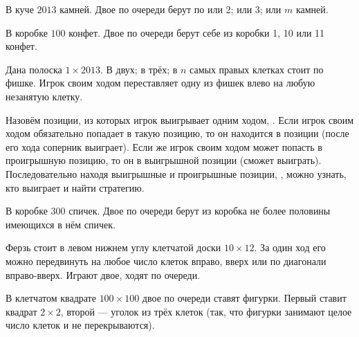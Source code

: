 \documentclass[a4paper,11pt]{article}
\begin{document}
В куче $2013$ камней. Двое по очереди берут по
 или 2;
 или 3;
 или $m$ камней. %

В коробке $100$ конфет. Двое по очереди берут себе из коробки
1, 10 или 11 конфет. %


Дана полоска $1\times2013$.
 В двух;
 в трёх;
 в $n$ самых правых клетках стоит по фишке.
Игрок своим ходом переставляет одну из фишек влево
на любую незанятую клетку.

\vspace*{.5mm}
{\small
Назовём позиции, из которых игрок выигрывает одним ходом,
. Если игрок своим ходом обязательно попадает
в такую позицию, то он находится в  позиции
(после его хода соперник выиграет). %
Если же игрок своим ходом может попасть в проигрышную позицию,
то он в выигрышной позиции (сможет выиграть).
Последовательно находя выигрышные и проигрышные позиции,
,
можно узнать, кто выиграет и найти стратегию.
}

\vspace*{1mm}

В коробке 300 спичек. Двое по очереди
берут из коробка не более половины имеющихся в нём спичек.


Ферзь стоит в левом нижнем углу клетчатой доски $10\times12$. За один ход его
можно передвинуть на любое число клеток вправо, вверх или по диагонали
 вправо-вверх. Играют двое, ходят по очереди.





\vspace*{-1truemm}



В клетчатом квадрате $100\times100$ двое по
очереди ставят фигурки.
Первый ставит квадрат $2\times2$, второй
--- уголок из трёх клеток (так, что
фигурки занимают целое число клеток и не перекрываются).
\end{document}
